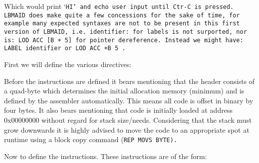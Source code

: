 \medskip
\bcode
\ecode
\medskip

\noindent Which would print `\tt HI\rm' and echo user input until Ctr-C is pressed. LBMAID does make quite a few concessions for the sake of time, for
example many expected syntaxes are not to be present in this first version of LBMAID, i.e. \tt identifier: \rm for labels is not surported, nor is:
\tt LOD ACC [B + 5] \rm for pointer dereference. Instead we might have: \tt LABEL identifier \rm or \tt LOD ACC +B 5 \rm.

First we will define the various directives:


\noindent Before the instructions are defined it bears mentioning that the header consists of a quad-byte which determines the initial allocation memory
(minimum) and is defined by the assembler automatically. This means all code is offset in binary by four bytes. It also bears mentioning that code is
initially loaded at address 0x00000000 without regard for stack size/needs. Considering that the stack must grow downwards it is highly advised to move
the code to an appropriate spot at runtime using a block copy command (\tt REP MOVS BYTE\rm).

Now to define the instructions. These instructions are of the form:

